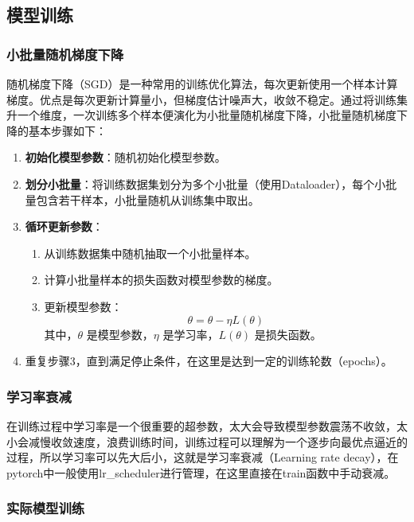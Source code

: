 \subsection{模型训练}

\subsubsection{小批量随机梯度下降}

随机梯度下降（SGD）是一种常用的训练优化算法，每次更新使用一个样本计算梯度。优点是每次更新计算量小，但梯度估计噪声大，收敛不稳定。通过将训练集升一个维度，一次训练多个样本便演化为小批量随机梯度下降，小批量随机梯度下降的基本步骤如下：

\begin{enumerate}
    \item \textbf{初始化模型参数}：随机初始化模型参数。
    \item \textbf{划分小批量}：将训练数据集划分为多个小批量（使用Dataloader），每个小批量包含若干样本，小批量随机从训练集中取出。
    \item \textbf{循环更新参数}：
    \begin{enumerate}
        \item 从训练数据集中随机抽取一个小批量样本。
        \item 计算小批量样本的损失函数对模型参数的梯度。
        \item 更新模型参数：
        $$
            \theta = \theta - \eta L(\theta) 
        $$
        其中，$\theta$ 是模型参数，$\eta$ 是学习率，$L(\theta)$ 是损失函数。
\end{enumerate}
    \item 重复步骤3，直到满足停止条件，在这里是达到一定的训练轮数（epochs）。
\end{enumerate}

\subsubsection{学习率衰减}

在训练过程中学习率是一个很重要的超参数，太大会导致模型参数震荡不收敛，太小会减慢收敛速度，浪费训练时间，训练过程可以理解为一个逐步向最优点逼近的过程，所以学习率可以先大后小，这就是学习率衰减（Learning rate decay），在pytorch中一般使用lr\_scheduler进行管理，在这里直接在train函数中手动衰减。

\subsubsection{实际模型训练}

